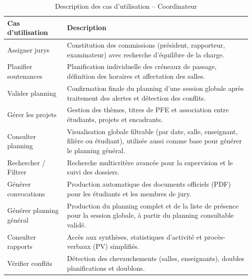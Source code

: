 \documentclass[12pt,a4paper]{article}
\begin{document}
\begin{table}[H]
    \centering
    \small
    \begin{tabular}{lp{10cm}}
        \toprule
        \rowcolor{primary!10}
        \textbf{Cas d'utilisation} & \textbf{Description}                                                                                       \\
        \midrule
        Assigner jurys             & Constitution des commissions (président, rapporteur, examinateur) avec recherche d'équilibre de la charge. \\
        \addlinespace
        Planifier soutenances      & Planification individuelle des créneaux de passage, définition des horaires et affectation des salles.     \\
        \addlinespace
        Valider planning           & Confirmation finale du planning d'une session globale après traitement des alertes et détection des conflits.                    \\
        \addlinespace
        Gérer les projets          & Gestion des thèmes, titres de PFE et association entre étudiants, projets et encadrants.                   \\
        \addlinespace
        Consulter planning         & Visualisation globale filtrable (par date, salle, enseignant, filière ou étudiant), utilisée aussi comme base pour générer le planning général.                        \\
        \addlinespace
        Rechercher / Filtrer       & Recherche multicritère avancée pour la supervision et le suivi des dossiers.                               \\
        \addlinespace
        Générer convocations       & Production automatique des documents officiels (PDF) pour les étudiants et les membres de jury.            \\
        \addlinespace
        Générer planning général   & Production du planning complet et de la liste de présence pour la session globale, à partir du planning consultable validé.                   \\
        \addlinespace
        Consulter rapports         & Accès aux synthèses, statistiques d'activité et procès-verbaux (PV) simplifiés.                            \\
        \addlinespace
        Vérifier conflits          & Détection des chevauchements (salles, enseignants), doubles planifications et doublons.                    \\
        \bottomrule
    \end{tabular}
    \caption{Description des cas d'utilisation -- Coordinateur}
\end{table}
\end{document}
